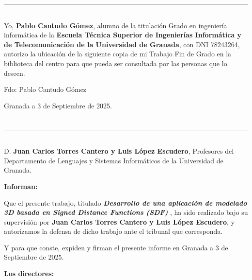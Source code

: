 \noindent\rule[-1ex]{\textwidth}{2pt}\\[4.5ex]

Yo, \textbf{Pablo Cantudo Gómez}, alumno de la titulación Grado en ingeniería informática de la \textbf{Escuela Técnica Superior
de Ingenierías Informática y de Telecomunicación de la Universidad de Granada}, con DNI 78243264, autorizo la
ubicación de la siguiente copia de mi Trabajo Fin de Grado en la biblioteca del centro para que pueda ser
consultada por las personas que lo deseen.

\vspace{6cm}

\noindent Fdo: Pablo Cantudo Gómez

\vspace{2cm}

\begin{flushright}
Granada a 3 de Septiembre de 2025.
\end{flushright}


\chapter*{}
\thispagestyle{empty}

\noindent\rule[-1ex]{\textwidth}{2pt}\\[4.5ex]

D. \textbf{Juan Carlos Torres Cantero y Luis López Escudero}, Profesores del Departamento de Lenguajes y Sistemas Informáticos de la Universidad de Granada.

\vspace{0.5cm}

\textbf{Informan:}

\vspace{0.5cm}

Que el presente trabajo, titulado \textit{\textbf{Desarrollo de una aplicación
de modelado 3D
basada en Signed Distance Functions (SDF)
}},
ha sido realizado bajo su supervisión por \textbf{Juan Carlos Torres Cantero y Luis López Escudero}, y autorizamos la defensa de dicho trabajo ante el tribunal
que corresponda.

\vspace{0.5cm}

Y para que conste, expiden y firman el presente informe en Granada a 3 de Septiembre de 2025.

\vspace{1cm}

\textbf{Los directores:}

\vspace{5cm}

